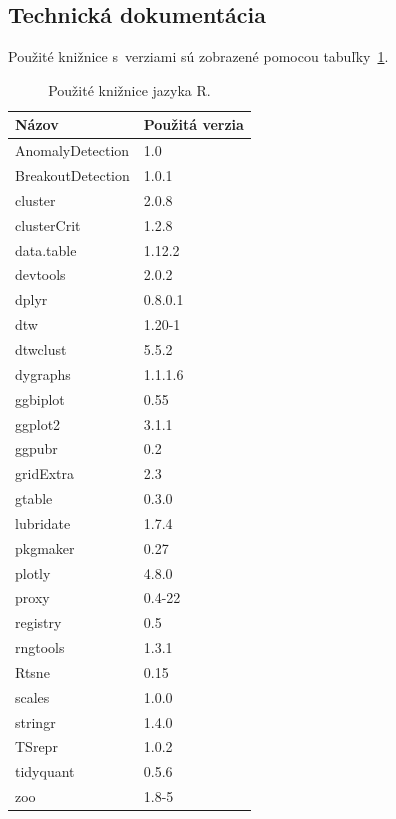 \documentclass[a4paper,twoside,slovak,12pt,appendix]{article}
\begin{document}
\begin{appendices}
\newpage
{}

\section{Technická dokumentácia}
Použité knižnice s~verziami sú zobrazené pomocou tabuľky~\ref{tab:libraries}.

\begin{table}[ht]
  \centering
  \caption{Použité knižnice jazyka R.}
  \label{tab:libraries}
  \begin{tabular}{|l|l|}
    \hline
    \textbf{Názov}  &   \textbf{Použitá verzia}  \\ \hline
    AnomalyDetection    &   1.0         \\ \hline
    BreakoutDetection   &   1.0.1       \\ \hline
    cluster             &   2.0.8       \\ \hline
    clusterCrit         &   1.2.8       \\ \hline
    data.table          &   1.12.2      \\ \hline
    devtools            &   2.0.2       \\ \hline
    dplyr               &   0.8.0.1     \\ \hline
    dtw                 &   1.20-1      \\ \hline
    dtwclust            &   5.5.2       \\ \hline
    dygraphs            &   1.1.1.6     \\ \hline
    ggbiplot            &   0.55        \\ \hline
    ggplot2             &   3.1.1       \\ \hline
    ggpubr              &   0.2         \\ \hline
    gridExtra           &   2.3         \\ \hline
    gtable              &   0.3.0       \\ \hline
    lubridate           &   1.7.4       \\ \hline
    pkgmaker            &   0.27        \\ \hline
    plotly              &   4.8.0       \\ \hline
    proxy               &   0.4-22      \\ \hline
    registry            &   0.5         \\ \hline
    rngtools            &   1.3.1       \\ \hline
    Rtsne               &   0.15        \\ \hline
    scales              &   1.0.0       \\ \hline
    stringr             &   1.4.0       \\ \hline
    TSrepr              &   1.0.2       \\ \hline
    tidyquant           &   0.5.6       \\ \hline
    zoo                 &   1.8-5       \\ \hline
  \end{tabular}
\end{table}


\end{appendices}
\end{document}

